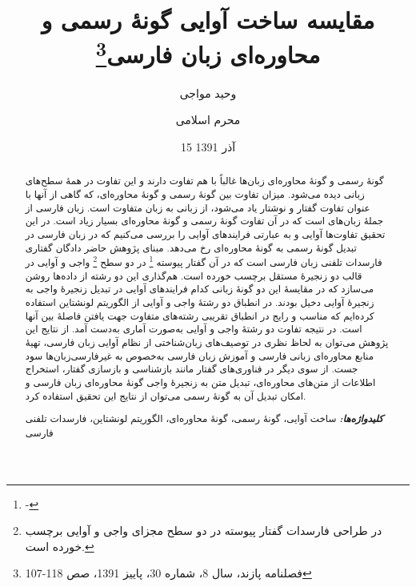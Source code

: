 \documentclass[12pt,onecolumn,a4paper]{article}
\providecommand{\keywords}[1]{\textbf{\textit{کلیدواژه‌ها:}} #1}
\begin{document}
    \title{مقایسه ساخت آوایی گونهٔ رسمی و محاوره‌ای زبان فارسی\footnote{فصلنامه پازند، سال 8، شماره 30، پاییز 1391، صص 118-107}}
    \author[1]{وحید مواجی}
    \author[2]{محرم اسلامی}
    \date{15 آذر 1391}
    \maketitle

    \begin{abstract}
        گونهٔ رسمی و گونهٔ محاوره‌ای زبان‌ها غالباً با هم تفاوت‌ دارند و این تفاوت در همهٔ سطح‌های زبانی دیده می‌شود. میزان تفاوت بین گونهٔ رسمی و گونهٔ محاوره‌ای، که گاهی از آنها با عنوان تفاوت گفتار و نوشتار یاد می‌شود، از زبانی به زبان متفاوت است. زبان فارسی از جملهٔ زبان‌های است که در آن تفاوت گونهٔ رسمی و گونهٔ محاوره‌ای بسیار زیاد است. در این تحقیق تفاوت‌ها آوایی و به عبارتی فرایندهای آوایی را بررسی می‌کنیم که در زبان فارسی در تبدیل گونهٔ رسمی به گونهٔ محاوره‌ای رخ می‌دهد. مبنای پژوهش حاضر دادگان گفتاری فارسدات تلفنی زبان فارسی  است که در آن گفتار پیوسته
        \footnote{-}
        در دو سطح
        \footnote{در طراحی فارسدات گفتار پیوسته در دو سطح مجزای واجی و آوایی برچسب خورده است.}
        واجی  و آوایی  در قالب دو زنجیرهٔ مستقل برچسب خورده است. هم‌گذاری این دو رشته از داده‌ها روشن می‌سازد که در مقایسهٔ این دو گونهٔ زبانی کدام فرایندهای آوایی در تبدیل زنجیرهٔ واجی به زنجیرهٔ آوایی دخیل بودند. در انطباق دو رشتهٔ واجی و آوایی از الگوریتم لونشتاین  استفاده کرده‌ایم که مناسب و رایج در انطباق تقریبی رشته‌های متفاوت جهت یافتن فاصلهٔ بین آنها است. در نتیجه تفاوت دو رشتهٔ واجی و آوایی به‌صورت آماری به‌دست آمد. از نتایج این پژوهش می‌توان به لحاظ نظری در توصیف‌های زبان‌شناختی از نظام آوایی زبان فارسی، تهیهٔ منابع محاوره‌ای زبانی فارسی و آموزش زبان فارسی به‌خصوص به غیرفارسی‌زبان‌ها سود جست. از سوی دیگر در فناوری‌های گفتار مانند بازشناسی و بازسازی گفتار، استخراج اطلاعات از متن‌های محاوره‌ای، تبدیل متن به زنجیرهٔ واجی گونهٔ محاوره‌ای زبان فارسی و امکان تبدیل آن به گونهٔ رسمی می‌توان از نتایج این تحقیق استفاده کرد.
        \par
        \keywords{ساخت آوایی، گونهٔ رسمی، گونهٔ محاوره‌ای، الگوریتم لونشتاین، فارسدات تلفنی فارسی}
    \end{abstract}
\end{document}
